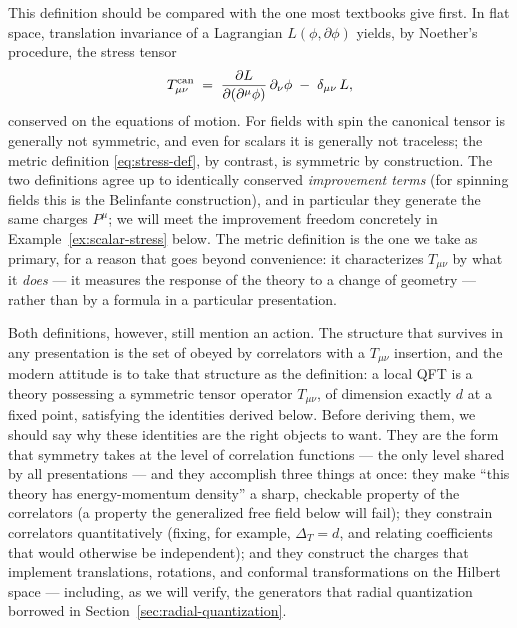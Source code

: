 This definition should be compared with the one most textbooks give first.
In flat space, translation invariance of a Lagrangian $L(\phi,
\partial\phi)$ yields, by Noether's procedure, the  stress
tensor
\begin{equation}
T^{\rm can}_{\mu\nu} \;=\;
\frac{\partial L}{\partial(\partial^\mu \phi)}\,\partial_\nu \phi
\;-\; \delta_{\mu\nu}\, L ,
\label{eq:canonical-def}
\end{equation}
conserved on the equations of motion. For fields with spin the canonical
tensor is generally not symmetric, and even for scalars it is generally not
traceless; the metric definition \eqref{eq:stress-def}, by contrast, is
symmetric by construction. The two definitions agree up to identically
conserved \emph{improvement terms} (for spinning fields this is the
Belinfante construction), and in particular they generate the same charges
$P^\mu$; we will meet the improvement freedom concretely in
Example~\ref{ex:scalar-stress} below. The metric definition is the one we
take as primary, for a reason that goes beyond convenience: it
characterizes $T_{\mu\nu}$ by what it \emph{does} --- it measures the
response of the theory to a change of geometry --- rather than by a formula
in a particular presentation.

Both definitions, however, still mention an action. The structure that
survives in any presentation is the set of  obeyed by
correlators with a $T_{\mu\nu}$ insertion, and the modern attitude is to
take that structure as the definition: a local QFT is a theory possessing a
symmetric tensor operator $T_{\mu\nu}$, of dimension exactly $d$ at a fixed
point, satisfying the identities derived below. Before deriving them, we
should say why these identities are the right objects to want. They are the form that symmetry
takes at the level of correlation functions --- the only level shared by all
presentations --- and they accomplish three things at once: they make
``this theory has energy-momentum density'' a sharp, checkable property of
the correlators (a property the generalized free field below will fail);
they constrain correlators quantitatively (fixing, for example, $\Delta_T =
d$, and relating coefficients that would otherwise be independent); and they
construct the charges that implement translations, rotations, and conformal
transformations on the Hilbert space --- including, as we will verify, the
generators that radial quantization borrowed in
Section~\ref{sec:radial-quantization}.

